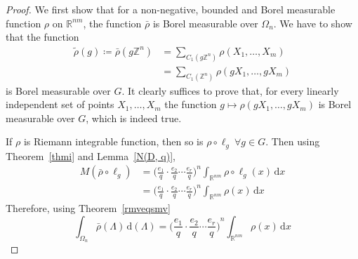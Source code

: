 \documentclass[11pt]{article}
\theoremstyle{definition}
\theoremstyle{proof}
\begin{document}
\begin{proof}
    We first show that for a non-negative, bounded and Borel measurable function $\rho$ on $\mathbb{R}^{nm}$, the function $\bar{\rho }$ is Borel measurable over ${\Omega}_n$.
    We have to show that the function
    \begin{align*}
        \widetilde{\rho }(g) \coloneqq \bar{\rho }(g \mathbb{Z}^{n}) &= \sum\limits_{C_1(g \mathbb{Z}^{n})} \rho (X_1, \ldots, X_m) \\
        &= \sum\limits_{C_1(\mathbb{Z}^{n})} \rho (g X_1, \ldots, g X_m)
    \end{align*}
    is Borel measurable over $G$.
    It clearly suffices to prove that, for every linearly independent set of points $X_1, \ldots, X_m$ the function $g \mapsto \rho (g X_1, \ldots, g X_m)$ is Borel measurable over $G$, which is indeed true.

    If $\rho$ is Riemann integrable function, then so is $\rho \circ \ell_g \ \forall g \in G$.
    Then using Theorem~\ref{thmi} and Lemma~\ref{N(D, q)},
    \begin{align*}
        M(\bar{\rho }\circ \ell_g) &= {\bigg(\frac{e_1}{q} \cdot \frac{e_2}{q} \cdots \frac{e_r}{q} \bigg)}^n \int_{\mathbb{R}^{nm}} \rho \circ \ell_g (x) \, \mathrm{d} x \\
        &= {\bigg(\frac{e_1}{q} \cdot \frac{e_2}{q} \cdots \frac{e_r}{q} \bigg)}^n \int_{\mathbb{R}^{nm}} \rho (x) \, \mathrm{d} x 
    \end{align*}
    Therefore, using Theorem~\ref{rmveqsmv}
    \[
        \int_{{\Omega}_n} \bar{\rho } (\Lambda ) \, \mathrm{d} (\Lambda ) = {\bigg(\frac{e_1}{q} \cdot \frac{e_2}{q} \cdots \frac{e_r}{q} \bigg)}^n \int_{\mathbb{R}^{nm}} \rho (x) \, \mathrm{d} x
    \]


\end{proof}
\end{document}
